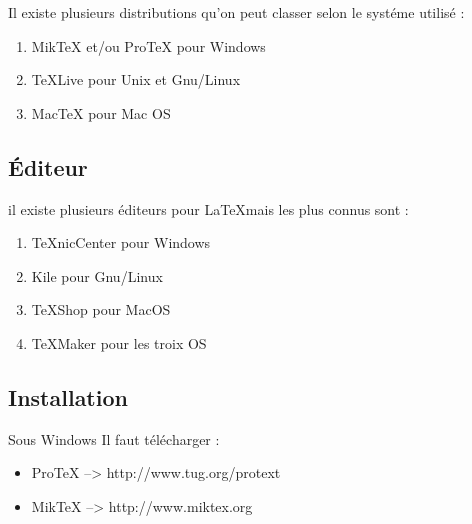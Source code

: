 \documentclass[12pt]{beamer}
\begin{document}
  \begin{frame}
   Il existe plusieurs distributions qu'on peut classer selon le systéme utilisé :
    \begin{enumerate}
     \item<2-> Mik\TeX{} et/ou Pro\TeX{} pour Windows 
     \item<3-> \TeX Live pour Unix et Gnu/Linux
     \item<4->  Mac\TeX{}  pour Mac OS
    \end{enumerate}
  \end{frame}

\subsection{Éditeur}
  \begin{frame}
  il existe plusieurs éditeurs pour \LaTeX mais les plus connus sont : 
    \begin{enumerate}
      \item<2-> \TeX nicCenter pour Windows
      \item<3-> Kile pour Gnu/Linux
      \item<4-> \TeX Shop pour MacOS
      \item<5-> \TeX Maker pour les troix OS 
    \end{enumerate}
  \end{frame}

\subsection{Installation}
  \begin{frame}
    \begin{block}{Sous Windows}
	Il faut télécharger : 
	\begin{itemize}
	 \item<2-> Pro\TeX{} -->  http://www.tug.org/protext
	 \item<3-> Mik\TeX{} -->  http://www.miktex.org
	\end{itemize}
    \end{block}
  \end{frame}
\end{document}
